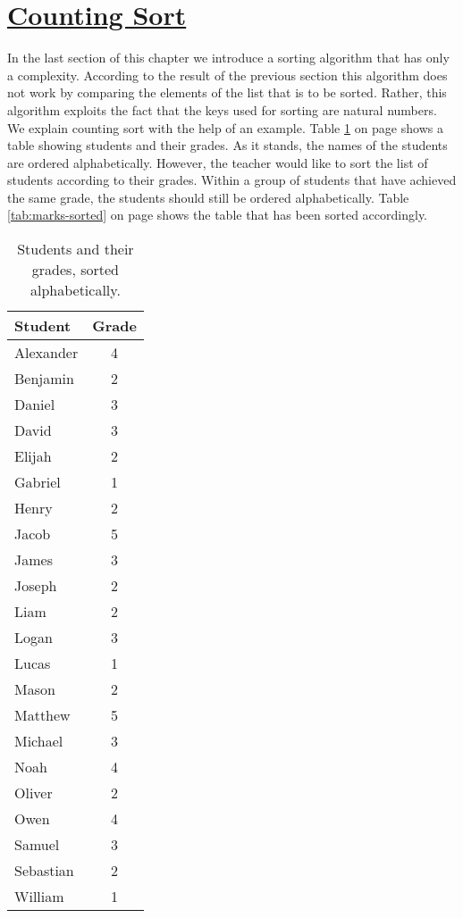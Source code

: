 \section{\href{https://en.wikipedia.org/wiki/Counting_sort}{Counting Sort}}
In the last section of this chapter we introduce a sorting algorithm that has only a  complexity.  According
to the result of the previous section this algorithm does not work by comparing the elements of the list that
is to be sorted.  Rather, this algorithm exploits the fact that the keys used for sorting are natural
numbers.  We explain counting sort with the help of an example.  Table \ref{tab:marks} on page
\pageref{tab:marks} shows a table showing students and their grades. 
As it stands, the names of the students are ordered alphabetically.  However, the teacher would like to sort
the list of students according to their grades.  Within a group of students that have achieved the same grade,
the students should still be ordered alphabetically.  Table \ref{tab:marks-sorted} on page \pageref{tab:marks-sorted}
shows the table that has been sorted accordingly.

\begin{table}[!ht]
  \centering
  \begin{tabular}{|l|c|}
    \hline
    Student   & Grade \\
    \hline
    \hline
    Alexander & 4 \\
    \hline
    Benjamin  & 2 \\
    \hline
    Daniel    & 3 \\
    \hline
    David     & 3 \\
    \hline
    Elijah    & 2 \\
    \hline
    Gabriel   & 1 \\
    \hline
    Henry     & 2 \\
    \hline
    Jacob     & 5 \\
    \hline
    James     & 3 \\
    \hline
    Joseph    & 2 \\
    \hline
    Liam      & 2 \\
    \hline
    Logan     & 3 \\
    \hline
    Lucas     & 1 \\
    \hline
    Mason     & 2 \\
    \hline
    Matthew   & 5 \\
    \hline
    Michael   & 3 \\
    \hline
    Noah      & 4 \\
    \hline
    Oliver    & 2 \\
    \hline
    Owen      & 4 \\
    \hline
    Samuel    & 3 \\
    \hline
    Sebastian & 2 \\
    \hline
    William   & 1 \\
    \hline
  \end{tabular}
  \caption{Students and their grades, sorted alphabetically.}
  \label{tab:marks}
\end{table}

